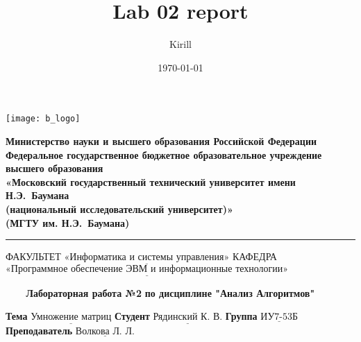 

\title{Lab 02 report}
\author{Kirill}

\date{\today}


\thispagestyle{empty}

\noindent \begin{minipage}{0.15\textwidth}
	\texttt{[image: b\_logo]}
\end{minipage}
\noindent\begin{minipage}{0.85\textwidth}\centering
	\textbf{Министерство науки и высшего образования Российской Федерации}\\
	\textbf{Федеральное государственное бюджетное образовательное учреждение высшего образования}\\
	\textbf{«Московский государственный технический университет имени Н.Э.~Баумана}\\
	\textbf{(национальный исследовательский университет)»}\\
	\textbf{(МГТУ им. Н.Э.~Баумана)}
\end{minipage}

\noindent\rule{16cm}{3pt}
\newline\newline
\noindent ФАКУЛЬТЕТ $\underline{\text{«Информатика и системы управления»}}$ \newline\newline
\noindent КАФЕДРА $\underline{\text{«Программное обеспечение ЭВМ и информационные технологии»}}$\newline


\begin{center}
	\noindent\begin{minipage}{1.3\textwidth}\centering
	\Large\textbf{   ~~~ Лабораторная работа №2}\newline
	\textbf{по дисциплине "Анализ Алгоритмов"}\newline\newline\newline
	\end{minipage}
\end{center}

\noindent\textbf{Тема} $\underline{\text{Умножение матриц}}$\newline\newline
\noindent\textbf{Студент} $\underline{\text{Рядинский К. В.}}$\newline\newline
\noindent\textbf{Группа} $\underline{\text{ИУ7-53Б}}$\newline\newline
\noindent\textbf{Преподаватель} $\underline{\text{Волкова Л. Л.}}$\newline

